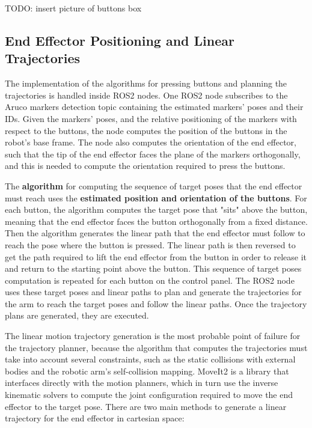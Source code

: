 TODO: insert picture of buttons box

\subsection{End Effector Positioning and Linear Trajectories}


The implementation of the algorithms for pressing buttons and planning the trajectories is handled inside
ROS2 nodes. One ROS2 node subscribes to the Aruco markers detection topic containing the estimated markers' poses 
and their IDs. Given the markers' poses, and the relative positioning of the markers with respect to the buttons,
the node computes the position of the buttons in the robot's base frame. The node also computes the orientation
of the end effector, such that the tip of the end effector faces the plane of the markers orthogonally, and this
is needed to compute the orientation required to press the buttons.

The \textbf{algorithm} for computing the sequence of target poses that the end effector must reach uses the 
\textbf{estimated position and orientation of the buttons}. For each button, the algorithm computes the target pose that 
"sits" above the button, meaning that the end effector faces the button orthogonally from a fixed distance.
Then the algorithm generates the linear path that the end effector must follow to reach the pose where 
the button is pressed. The linear path is then reversed to get the path required to lift the end effector 
from the button in order to release it and return to the starting point above the button. This sequence
of target poses computation is repeated for each button on the control panel. The ROS2 node uses these target 
poses and linear paths to plan and generate the trajectories for the arm to reach the target poses and 
follow the linear paths. Once the trajectory plans are generated, they are executed.

The linear motion trajectory generation is the most probable point of failure for the trajectory planner,
because the algorithm that computes the trajectories must take into account several constraints,
such as the static collisions with external bodies and the robotic arm's self-collision mapping.
MoveIt2 is a library that interfaces directly with the motion planners, which in turn use the inverse
kinematic solvers to compute the joint configuration required to move the end effector to the target pose.
There are two main methods to generate a linear trajectory for the end effector in cartesian space:

